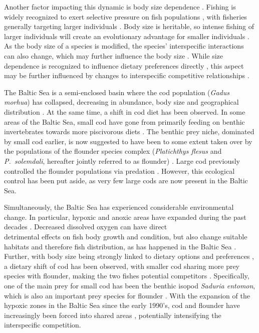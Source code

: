 \documentclass[9pt,twocolumn,twoside]{pnas-new}
\begin{document}
Another factor impacting this dynamic is body size dependence \citep{Ahti2020}. Fishing is widely recognized to exert selective pressure on fish populations \citep{Law2000, Kuparinen2009}, with fisheries generally targeting larger individuals \citep{Kuparinen2009, Hunter2015}. Body size is heritable, so intense fishing of larger individuals will create an evolutionary advantage for smaller individuals \citep{Nielsen2014, Kuparinen2017}. As the body size of a species is modified, the species' interspecific interactions can also change, which may further influence the body size \citep{Edeline2021}. While size dependence is recognized to influence dietary preferences directly \citep{Ahti2020}, this aspect may be further influenced by changes to interspecific competitive relationships \citep{Edeline2021}.

The Baltic Sea is a semi-enclosed basin where the cod population (\textit{Gadus morhua}) has collapsed, decreasing in abundance, body size and geographical distribution \citep{Orio2020, ICES2022}. At the same time, a shift in cod diet has been observed. In some areas of the Baltic Sea, small cod have gone from primarily feeding on benthic invertebrates towards more piscivorous diets \citep{ICES2015, Haase2020}. The benthic prey niche, dominated by small cod earlier, is now suggested to have been to some extent taken over by the populations of the flounder species complex (\textit{Platichthys flesus} and \textit{P.~solemdali}, hereafter jointly referred to as flounder) \citep{Haase2020}. Large cod previously controlled the flounder populations via predation \citep{Orio2020}. However, this ecological control has been put aside, as very few large cods are now present in the Baltic Sea.

Simultaneously, the Baltic Sea has experienced considerable environmental change. In particular, hypoxic and anoxic areas have expanded during the past decades \citep{Carstensen2014}. Decreased dissolved oxygen can have direct\\detrimental effects on fish body growth and condition, but also change suitable habitats and therefore fish distribution, as has happened in the Baltic Sea \citep{Casini2016, Bartolino2017, Orio2019, Orio2020, Lindmark2023}.  Further, with body size being strongly linked to dietary options and preferences \citep{Schneider2016}, a dietary shift of cod has been observed, with smaller cod sharing more prey species with flounder, making the two fishes potential competitors \citep{Haase2020}. Specifically, one of the main prey for small cod has been the benthic isopod \textit{Saduria entomon}, which is also an important prey species for flounder \citep{Haase2020}. With the expansion of the hypoxic zones in the Baltic Sea since the early 1990's, cod and flounder have increasingly been forced into shared areas \citep{Orio2019}, potentially intensifying the interspecific competition. 
\end{document}
